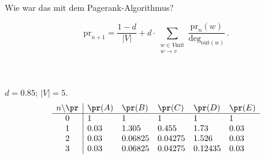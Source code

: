 \documentclass[ngerman, hyperref={pdfpagelabels=false}]{beamer}
\newcommand{\vertex}{\node[vertex]}
\begin{document}
\begin{frame}{Wie war das mit dem Pagerank-Algorithmus?}
    \begin{minipage}{.39\textwidth}
    \end{minipage}
    \begin{minipage}{.55\textwidth}
        \begin{equation*}
            \mathrm{pr}_{n+1} = \frac{1-d}{|V|} + d \cdot \sum_{\substack{w\in V
            \text{mit}\\w\to v}} \frac{\mathrm{pr}_{n}(w)}{\mathrm{deg}_{\text{out}(w)}}\,.
            \label{eq:pagerank}
        \end{equation*}
    \end{minipage}
    \\ ~\\
$d = 0.85$; $|V| = 5$. 
\begin{equation*}
   \begin{array}{c | lllll}
       n\backslash \pr & \pr(A) & \pr(B) & \pr(C) & \pr(D) & \pr(E) \\
       \hline
       0 & 1 & 1 & 1 & 1 & 1 \\
       1 & 0.03 & 1.305 & 0.455 & 1.73 & 0.03 \\
       2 & 0.03 & 0.06825 & 0.04275 & 1.526 & 0.03 \\
       3 & 0.03 & 0.06825 & 0.04275 & 0.12435 & 0.03 
   \end{array} 
\end{equation*}
\end{frame}
\end{document}
